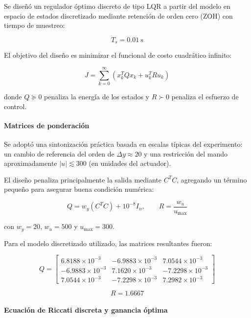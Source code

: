 
Se diseñó un regulador óptimo discreto de tipo LQR a partir del modelo
en espacio de estados discretizado mediante retención de orden cero (ZOH)
con tiempo de muestreo:

\[
T_s = 0.01 \ \text{s}
\]

El objetivo del diseño es minimizar el funcional de costo cuadrático infinito:

\[
J=\sum_{k=0}^{\infty}(x_k^TQx_k+u_k^TRu_k)
\]

donde \(Q\succeq 0\) penaliza la energía de los estados y \(R\succ 0\) penaliza
el esfuerzo de control.

\paragraph{Matrices de ponderación}

Se adoptó una sintonización práctica basada en escalas típicas del experimento:
un cambio de referencia del orden de \(\Delta y \approx 20\) y una restricción del
mando aproximadamente \(|u|\lesssim 300\) (en unidades del actuador).

El diseño penaliza principalmente la salida mediante \(C^TC\), agregando un término
pequeño para asegurar buena condición numérica:

\[
Q = w_y(C^TC) + 10^{-8}I_n,
\qquad
R = \frac{w_u}{u_{\max}}
\]

con \(w_y=20\), \(w_u=500\) y \(u_{\max}=300\).

Para el modelo discretizado utilizado, las matrices resultantes fueron:

\[
Q=
\begin{bmatrix}
	6.8188\times 10^{-3} & -6.9883\times 10^{-3} &  7.0544\times 10^{-3}\\
	-6.9883\times 10^{-3} &  7.1620\times 10^{-3} & -7.2298\times 10^{-3}\\
	7.0544\times 10^{-3} & -7.2298\times 10^{-3} &  7.2982\times 10^{-3}
\end{bmatrix}
\]

\[
R = 1.6667
\]

\paragraph{Ecuación de Riccati discreta y ganancia óptima}

